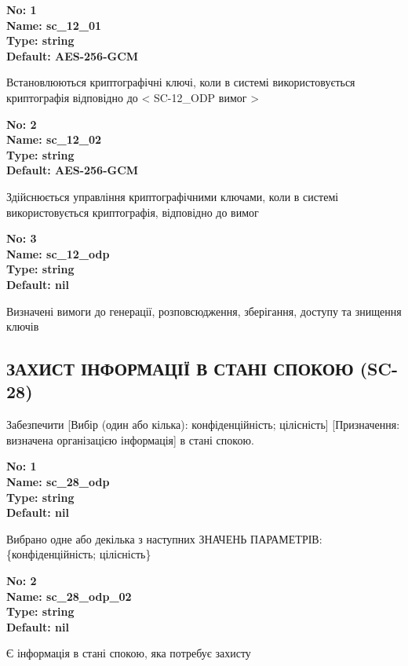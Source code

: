 \documentclass{article}
\begin{document}
\vspace{10pt}
{\footnotesize\bfseries
No: 1\\
Name: sc\_\allowbreak{}12\_\allowbreak{}01\\
Type: string\\
Default: \textquotedbl{}AES-256-GCM\textquotedbl{}
}

{\footnotesize Встановлюються криптографічні ключі, коли в системі використовується криптографія відповідно до < SC-12\_\allowbreak{}ODP вимог >}


{\footnotesize\bfseries
No: 2\\
Name: sc\_\allowbreak{}12\_\allowbreak{}02\\
Type: string\\
Default: \textquotedbl{}AES-256-GCM\textquotedbl{}
}

{\footnotesize Здійснюється управління криптографічними ключами, коли в системі використовується криптографія, відповідно до вимог }


{\footnotesize\bfseries
No: 3\\
Name: sc\_\allowbreak{}12\_\allowbreak{}odp\\
Type: string\\
Default: nil
}

{\footnotesize Визначені вимоги до генерації, розповсюдження, зберігання, доступу та знищення ключів}




\subsection{ЗАХИСТ ІНФОРМАЦІЇ В СТАНІ СПОКОЮ (SC-28)}
Забезпечити [Вибір (один або кілька): конфіденційність; цілісність] [Призначення: визначена організацією інформація] в стані спокою.

\vspace{10pt}
{\footnotesize\bfseries
No: 1\\
Name: sc\_\allowbreak{}28\_\allowbreak{}odp\\
Type: string\\
Default: nil
}

{\footnotesize Вибрано одне або декілька з наступних ЗНАЧЕНЬ ПАРАМЕТРІВ: \{конфіденційність; цілісність\}}


{\footnotesize\bfseries
No: 2\\
Name: sc\_\allowbreak{}28\_\allowbreak{}odp\_\allowbreak{}02\\
Type: string\\
Default: nil
}

{\footnotesize Є інформація в стані спокою, яка потребує захисту}
\end{document}
